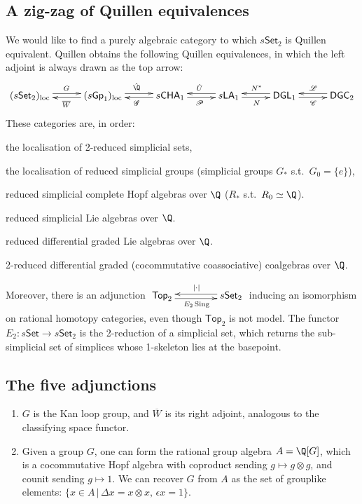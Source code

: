 \documentclass[11pt]{article}
\begin{document}
\begin{Jeremy RationalHomotopyPractice}
\subsection*{A zig-zag of Quillen equivalences}
We would like to find a purely algebraic category to which $s\mathsf{Set}_2$ is Quillen equivalent. Quillen obtains the following Quillen equivalences, in which the left adjoint is always drawn as the top arrow:
\[\xymatrix@R=.3cm@C=1cm{
(s\mathsf{Set}_2)_\textup{loc}  \ar@<.6ex>[r]^{G}
&(s\mathsf{Gp}_1)_\textup{loc}  \ar@<.4ex>[l]^{\overline{W}} \ar@<.6ex>[r]^{\hat\Q}
&s\mathsf{CHA}_1  \ar@<.4ex>[l]^{\scrG}\ar@<-.4ex>[r]_{\scrP}
&s\mathsf{LA}_1  \ar@<-.6ex>[l]_{\hat U}\ar@<-.4ex>[r]_{N}
&\mathsf{DGL}_1  \ar@<-.6ex>[l]_{N^*}\ar@<-.4ex>[r]_{\scrC}
&\mathsf{DGC}_2  \ar@<-.6ex>[l]_{\scrL}
}\]
These categories are, in order:
\begin{itemise}
\item the localisation of 2-reduced simplicial sets, 
\item the localisation of reduced simplicial groups (simplicial groups $G_*$ s.t.\ $G_0=\{e\}$),
\item reduced simplicial complete Hopf algebras over $\Q$ ($R_*$ s.t.\ $R_0\simeq\Q$).
\item reduced simplicial Lie algebras over $\Q$.
\item reduced differential graded Lie algebras over $\Q$.
\item 2-reduced differential graded (cocommutative coassociative) coalgebras over $\Q$.
\end{itemise}
Moreover, there is an adjunction {$\xymatrix@R=.3cm@C=1.5cm{
\mathsf{Top}_2  \ar@<-.4ex>[r];[]_{|\cdot|}&
s\mathsf{Set}_2  \ar@<-.6ex>[l];[]_{E_2\Sing}
}
$} inducing an isomorphism on rational homotopy categories, even though $\mathsf{Top}_2$ is not model. The functor $E_2:s\mathsf{Set}\to s\mathsf{Set}_2$ is the 2-reduction of a simplicial set, which returns the sub-simplicial set of simplices whose 1-skeleton lies at the basepoint.
\subsection*{The five adjunctions}
\begin{enumerate}\squishlist
\item $G$ is the Kan loop group, and $\overline{W}$ is its right adjoint, analogous to the classifying space functor.
\item Given a group $G$, one can form the rational group algebra $A=\Q[G]$, which is a cocommutative Hopf algebra with coproduct sending $g\mapsto g\otimes g$, and counit sending $g\mapsto1$. We can recover $G$ from $A$ as the set of grouplike elements: $\{x\in A\,|\,\Delta x=x\otimes x,\,\epsilon x=1\}$.


\end{enumerate}
\end{Jeremy RationalHomotopyPractice}
\end{document}
